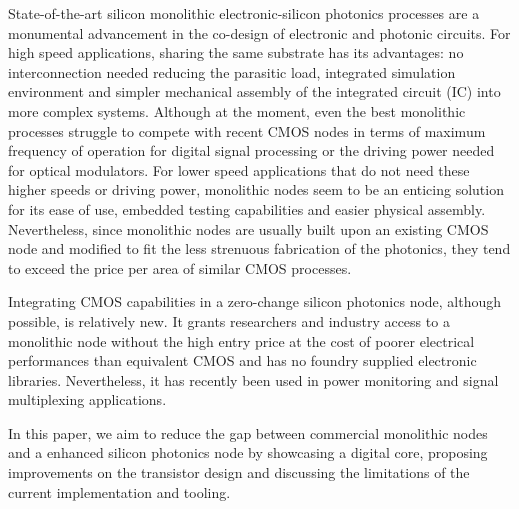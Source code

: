 State-of-the-art silicon monolithic electronic-silicon photonics processes are a monumental advancement in the co-design of electronic and photonic circuits.
For high speed applications, sharing the same substrate has its advantages: no interconnection needed reducing the parasitic load, integrated simulation environment and simpler mechanical assembly of the integrated circuit (IC) into more complex systems.
Although at the moment, even the best monolithic processes struggle to compete with recent CMOS nodes in terms of maximum frequency of operation for digital signal processing or the driving power needed for optical modulators. 
For lower speed applications that do not need these higher speeds or driving power, monolithic nodes seem to be an enticing solution for its ease of use, embedded testing capabilities and easier physical assembly.
Nevertheless, since monolithic nodes are usually built upon an existing CMOS node and modified to fit the less strenuous fabrication of the photonics, they tend to exceed the price per area of similar CMOS processes\cite{shekhar_roadmapping_2024}. 

Integrating CMOS capabilities in a zero-change silicon photonics node, although possible, is relatively new\cite{zanetto_unconventional_2023,shekhar_roadmapping_2024}. 
It grants researchers and industry access to a monolithic node without the high entry price at the cost of poorer electrical performances than equivalent CMOS and has no foundry supplied electronic libraries.
Nevertheless, it has recently been used in power monitoring and signal multiplexing applications\cite{crico_monolithic_2024,zanetto_timemultiplexed_2023}.

In this paper, we aim to reduce the gap between commercial monolithic nodes and a enhanced silicon photonics node by showcasing a digital core, proposing improvements on the transistor design and discussing the limitations of the current implementation and tooling.





